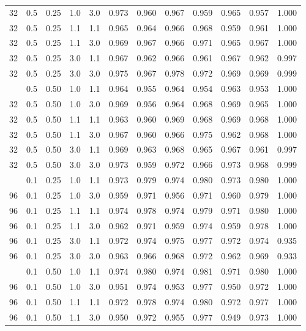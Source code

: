 \begin{longtable}[t]{cccccrrrrrrc}
32 & 0.5 & 0.25 & 1.0 & 3.0 & 0.973 & 0.960 & 0.967 & 0.959 & 0.965 & 0.957 & 1.000\\
32 & 0.5 & 0.25 & 1.1 & 1.1 & 0.965 & 0.964 & 0.966 & 0.968 & 0.959 & 0.961 & 1.000\\
32 & 0.5 & 0.25 & 1.1 & 3.0 & 0.969 & 0.967 & 0.966 & 0.971 & 0.965 & 0.967 & 1.000\\
32 & 0.5 & 0.25 & 3.0 & 1.1 & 0.967 & 0.962 & 0.966 & 0.961 & 0.967 & 0.962 & 0.997\\
32 & 0.5 & 0.25 & 3.0 & 3.0 & 0.975 & 0.967 & 0.978 & 0.972 & 0.969 & 0.969 & 0.999\\
\addlinespace
32 & 0.5 & 0.50 & 1.0 & 1.1 & 0.964 & 0.955 & 0.964 & 0.954 & 0.963 & 0.953 & 1.000\\
32 & 0.5 & 0.50 & 1.0 & 3.0 & 0.969 & 0.956 & 0.964 & 0.968 & 0.969 & 0.965 & 1.000\\
32 & 0.5 & 0.50 & 1.1 & 1.1 & 0.963 & 0.960 & 0.969 & 0.968 & 0.969 & 0.968 & 1.000\\
32 & 0.5 & 0.50 & 1.1 & 3.0 & 0.967 & 0.960 & 0.966 & 0.975 & 0.962 & 0.968 & 1.000\\
32 & 0.5 & 0.50 & 3.0 & 1.1 & 0.969 & 0.963 & 0.968 & 0.965 & 0.967 & 0.961 & 0.997\\
32 & 0.5 & 0.50 & 3.0 & 3.0 & 0.973 & 0.959 & 0.972 & 0.966 & 0.973 & 0.968 & 0.999\\
\addlinespace
96 & 0.1 & 0.25 & 1.0 & 1.1 & 0.973 & 0.979 & 0.974 & 0.980 & 0.973 & 0.980 & 1.000\\
96 & 0.1 & 0.25 & 1.0 & 3.0 & 0.959 & 0.971 & 0.956 & 0.971 & 0.960 & 0.979 & 1.000\\
96 & 0.1 & 0.25 & 1.1 & 1.1 & 0.974 & 0.978 & 0.974 & 0.979 & 0.971 & 0.980 & 1.000\\
96 & 0.1 & 0.25 & 1.1 & 3.0 & 0.962 & 0.971 & 0.959 & 0.974 & 0.959 & 0.978 & 1.000\\
96 & 0.1 & 0.25 & 3.0 & 1.1 & 0.972 & 0.974 & 0.975 & 0.977 & 0.972 & 0.974 & 0.935\\
96 & 0.1 & 0.25 & 3.0 & 3.0 & 0.963 & 0.966 & 0.968 & 0.972 & 0.962 & 0.969 & 0.933\\
\addlinespace
96 & 0.1 & 0.50 & 1.0 & 1.1 & 0.974 & 0.980 & 0.974 & 0.981 & 0.971 & 0.980 & 1.000\\
96 & 0.1 & 0.50 & 1.0 & 3.0 & 0.951 & 0.974 & 0.953 & 0.977 & 0.950 & 0.972 & 1.000\\
96 & 0.1 & 0.50 & 1.1 & 1.1 & 0.972 & 0.978 & 0.974 & 0.980 & 0.972 & 0.977 & 1.000\\
96 & 0.1 & 0.50 & 1.1 & 3.0 & 0.950 & 0.972 & 0.955 & 0.977 & 0.949 & 0.973 & 1.000\\

\end{longtable}
